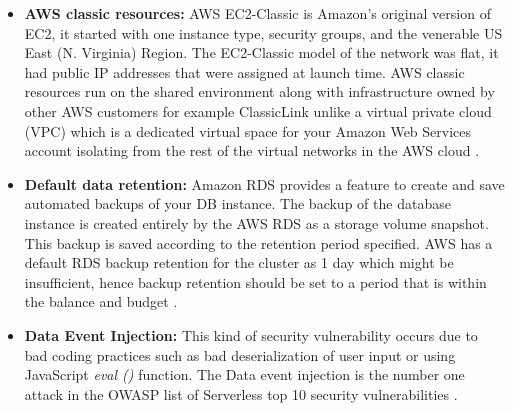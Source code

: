 \begin{itemize}
    \item \textbf{AWS classic resources:} AWS EC2-Classic is Amazon's original version of EC2,
    it started with one instance type, security groups, and the venerable US East (N. Virginia) Region.
    The EC2-Classic model of the network was flat, it had public IP addresses that were assigned at launch time.
    AWS classic resources run on the shared environment along with infrastructure owned by other AWS customers for
    example ClassicLink unlike a virtual private cloud
    (VPC) which is a dedicated virtual space for your Amazon Web Services account isolating from the rest of the virtual networks in the AWS cloud \cite{69}.
\end{itemize}

\begin{itemize}
    \item \textbf{Default data retention:} Amazon RDS provides a feature to create and save automated backups of your DB
    instance.
    The backup of the database instance is created entirely by the AWS RDS as a storage volume snapshot.
    This
    backup is saved according to the retention period specified.
    AWS has a default RDS backup retention for the
    cluster as 1 day which might be insufficient, hence backup retention should be set to a period that
    is within the balance and budget \cite{36} \cite{38}.
\end{itemize}

\begin{itemize}
    \item \textbf{Data Event Injection:} This kind of security vulnerability occurs due to bad coding practices such
    as bad
    deserialization of user input or using JavaScript \textit{eval ()} function.
    The Data event injection is the
    number
    one
    attack in the OWASP list of Serverless top 10
    security vulnerabilities \cite{68}.
\end{itemize}

